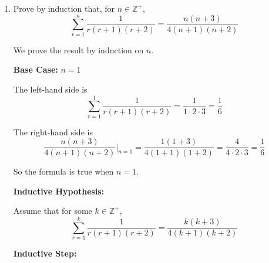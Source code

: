 \documentclass[leqno]{article}
\newcommand{\questionitem}{%
  \item\phantomsection
  \addcontentsline{toc}{section}{Question \number\value{enumi}}%
}
\begin{document}
\begin{enumerate}[
  label=\textbf{\arabic*.},
  leftmargin=*,
  topsep=0pt,
  partopsep=0pt,
  parsep=0pt
]
\begin{tcolorbox}[colback=white, colframe=scarlet, title={\textbf{Solution}}, breakable, grow to left by=6mm, grow to right by=10mm]
Therefore
\[
(2k)!(2k+1)!(2k+1)(2k+3)=\frac{(2k+2)!(2k+3)!}{(2k+2)^2}
\]

Substituting this into the expression for \(S_{k+1}\),
\[
S_{k+1}
=\log\left(\frac{(2k+2)!(2k+3)!}{2^{4k}(k!)^4(2k+2)^4}\right)
\]

Now simplify the denominator:
\[
(2k+2)^4=[2(k+1)]^4=2^4(k+1)^4
\]
and
\[
((k+1)!)^4=((k+1)k!)^4=(k+1)^4(k!)^4
\]

Hence
\[
2^{4k}(k!)^4(2k+2)^4
=2^{4k}\cdot 2^4\cdot (k+1)^4(k!)^4
=2^{4k+4}((k+1)!)^4
\]

So
\[
S_{k+1}
=\log\left(\frac{(2k+2)!(2k+3)!}{2^{4k+4}((k+1)!)^4}\right)
\]

This is exactly the required result for \(n=k+1\).

\textbf{Conclusion.}

The statement is true for \(n=1\), and if it is true for \(n=k\), then it is true for \(n=k+1\). Therefore, by mathematical induction,
\[
\sum_{r=1}^{n}\log\left(1-\frac{1}{4r^2}\right)=\log\left(\frac{(2n)!(2n+1)!}{2^{4n}(n!)^4}\right)
\]

for all positive integers \(n\).
\end{tcolorbox}


\newpage

\questionitem

Prove by induction that, for $n \in \mathbb{Z}^{+}$,
\[
\sum_{r=1}^{n} \frac{1}{r(r+1)(r+2)} = \frac{n(n+3)}{4(n+1)(n+2)}
\]

\vspace*{30pt}

\begin{tcolorbox}[colback=white, colframe=scarlet, title={\textbf{Solution}}, breakable, grow to left by=6mm, grow to right by=10mm]
We prove the result by induction on $n$.

\textbf{Base Case:} $n=1$

The left-hand side is
\[
\sum_{r=1}^{1} \frac{1}{r(r+1)(r+2)}=\frac{1}{1\cdot 2\cdot 3}=\frac16
\]

The right-hand side is
\[
\frac{n(n+3)}{4(n+1)(n+2)}\Bigg|_{n=1}
=\frac{1(1+3)}{4(1+1)(1+2)}
=\frac{4}{4\cdot 2\cdot 3}
=\frac16
\]

So the formula is true when $n=1$.

\textbf{Inductive Hypothesis:}

Assume that for some $k\in\mathbb{Z}^+$,
\[
\sum_{r=1}^{k} \frac{1}{r(r+1)(r+2)}
=
\frac{k(k+3)}{4(k+1)(k+2)}
\]

\textbf{Inductive Step:}


\end{tcolorbox}
\end{enumerate}
\end{document}
